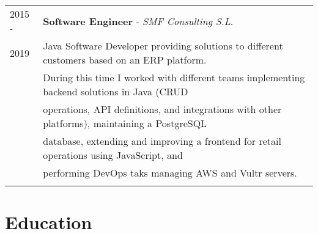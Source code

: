 \documentclass[a4paper,10pt]{article} %
\begin{document}
\begin{longtable}{ll}
2015 - & \textbf{Software Engineer} - \textit{SMF Consulting S.L}. \\ 
2019 & Java Software Developer providing solutions to different customers based on an ERP platform. \\ 
& During this time I worked with different teams implementing backend solutions in Java (CRUD \\ 
& operations, API definitions, and integrations with other platforms), maintaining a PostgreSQL \\
& database, extending and improving a frontend for retail operations using JavaScript, and  \\
& performing DevOps taks managing AWS and Vultr servers. \\ & \\

\end{longtable}


\section{Education}
\end{document}
